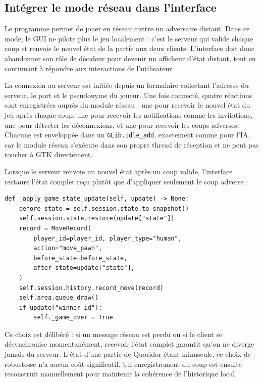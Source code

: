 \documentclass[a4paper]{article}
\begin{document}
\subsection{Intégrer le mode réseau dans l'interface}

Le programme permet de jouer en réseau contre un adversaire distant.
Dans ce mode, le GUI ne pilote plus le jeu localement : c'est le
serveur qui valide chaque coup et renvoie le nouvel état de la partie
aux deux clients. L'interface doit donc abandonner son rôle de décideur
pour devenir un afficheur d'état distant, tout en continuant à
répondre aux interactions de l'utilisateur.

La connexion au serveur est initiée depuis un formulaire collectant
l'adresse du serveur, le port et le pseudonyme du joueur. Une fois
connecté, quatre réactions sont enregistrées auprès du module réseau :
une pour recevoir le nouvel état du jeu après chaque coup, une pour
recevoir les notifications comme les invitations, une pour détecter
les déconnexions, et une pour recevoir les coups adverses. Chacune
est enveloppée dans un \texttt{GLib.idle\_add}, exactement comme pour
l'IA, car le module réseau s'exécute dans son propre thread de
réception et ne peut pas toucher à GTK directement.

Lorsque le serveur renvoie un nouvel état après un coup valide,
l'interface restaure l'état complet reçu plutôt que d'appliquer
seulement le coup adverse :

\begin{lstlisting}[caption={Restauration de l'état reçu du serveur}]
def _apply_game_state_update(self, update) -> None:
    before_state = self.session.state.to_snapshot()
    self.session.state.restore(update["state"])
    record = MoveRecord(
        player_id=player_id, player_type="human",
        action="move_pawn",
        before_state=before_state,
        after_state=update["state"],
    )
    self.session.history.record_move(record)
    self.area.queue_draw()
    if update["winner_id"]:
        self._game_over = True
\end{lstlisting}

Ce choix est délibéré : si un message réseau est perdu ou si le client
se désynchronise momentanément, recevoir l'état complet garantit qu'on
ne diverge jamais du serveur. L'état d'une partie de Quoridor étant
minuscule, ce choix de robustesse n'a
aucun coût significatif. Un enregistrement du coup est ensuite
reconstruit manuellement pour maintenir la cohérence de l'historique
local.
\end{document}
